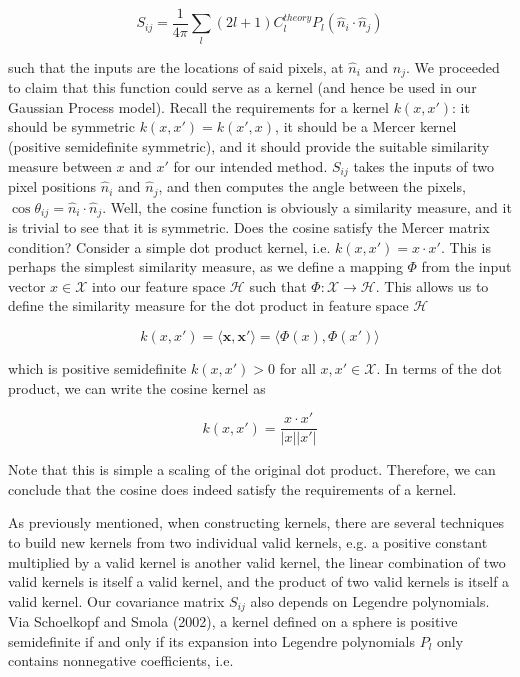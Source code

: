\documentclass[12pt]{article}
\begin{document}
\begin{equation}
S_{ij}=\frac{1}{4\pi}\sum\limits_{l}(2l+1)C^{theory}_l P_l (\hat{n}_i\cdot\hat{n}_j)
\end{equation}

such that the inputs are the locations of said pixels, at $\hat{n}_i$ and $\hat{n}_j$. We proceeded to claim that this function could serve as a kernel (and hence be used in our Gaussian Process model). Recall the requirements for a kernel $k(x,x')$: it should be symmetric $k(x,x')=k(x',x)$, it should be a Mercer kernel (positive semidefinite symmetric), and it should provide the suitable similarity measure between $x$ and $x'$ for our intended method. $S_{ij}$ takes the inputs of two pixel positions  $\hat{n}_i$ and $\hat{n}_j$, and then computes the angle between the pixels, $\cos\theta_{ij}=\hat{n}_i\cdot\hat{n}_j$. Well, the cosine function is obviously a similarity measure, and it is trivial to see that it is symmetric. Does the cosine satisfy the Mercer matrix condition? Consider a simple dot product kernel, i.e. $k(x,x')=x\cdot x'$. This is perhaps the simplest similarity measure, as we define a mapping $\Phi$ from the input vector $x\in\mathcal{X}$ into our feature space $\mathcal{H}$ such that $\Phi: \mathcal{X}\rightarrow\mathcal{H}$. This allows us to define the similarity measure for the dot product in feature space $\mathcal{H}$

\begin{equation}
k(x,x')=\langle\textbf{x},\textbf{x}'\rangle=\langle\Phi(x),\Phi(x')\rangle
\end{equation}

which is positive semidefinite $k(x,x')>0$ for all $x, x'\in\mathcal{X}$. In terms of the dot product, we can write the cosine kernel as

\begin{equation}
k(x,x')=\frac{x\cdot x'}{|x| |x'|}
\end{equation}

Note that this is simple a scaling of the original dot product. Therefore, we can conclude that the cosine does indeed satisfy the requirements of a kernel. 

As previously mentioned, when constructing kernels, there are several techniques to build new kernels from two individual valid kernels, e.g. a positive constant multiplied by a valid kernel is another valid  kernel, the linear combination of two valid kernels is itself a valid kernel, and the product of two valid kernels is itself a valid kernel. Our covariance matrix $S_{ij}$ also depends on Legendre polynomials. Via Schoelkopf and Smola (2002), a kernel defined on a sphere is positive semidefinite if and only if its expansion into Legendre polynomials $P_l$ only contains nonnegative coefficients, i.e. 
\end{document}
